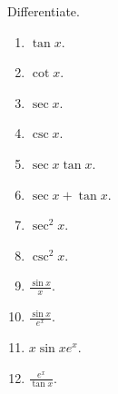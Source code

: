 Differentiate.

\begin{multicols}{2}
\begin{enumerate}
\item $\tan x$.

\item $\cot x$.

\item $\sec x$.

\item $\csc x$.

\item $\sec x\tan x$.

\item $\sec x+\tan x$.

\item $\sec^2 x$.

\item $\csc^2 x$.

\item $\displaystyle \frac{\sin x}{x}$.

\item $\displaystyle \frac{\sin x}{e^x}$.

\item $\displaystyle x\sin x e^x$.

\item $\displaystyle \frac{e^x}{\tan x}$.

\end{enumerate}

\end{multicols}